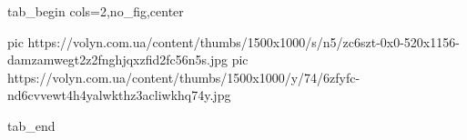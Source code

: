  
 
 
 
 


\ifcmt
  tab_begin cols=2,no_fig,center

     pic https://volyn.com.ua/content/thumbs/1500x1000/s/n5/zc6szt-0x0-520x1156-damzamwegt2z2fnghjqxzfid2fc56n5s.jpg
		 pic https://volyn.com.ua/content/thumbs/1500x1000/y/74/6zfyfc-nd6cvvewt4h4yalwkthz3acliwkhq74y.jpg

  tab_end
\fi
